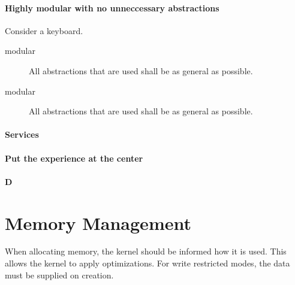 \documentclass[a4paper]{article}
\begin{document}
\begin{itemize}
\begin{itemize}
\paragraph{Highly modular with no unneccessary abstractions} Consider a keyboard. 

\begin{description}
  \item[modular] All abstractions that are used shall be as general as possible.
  \item[modular] All abstractions that are used shall be as general as possible.
\end{description}

\paragraph{Services}



\paragraph{Put the experience at the center} 
\paragraph{D} 




\section{Memory Management}

When allocating memory, the kernel should be informed how it is used. This allows the kernel to apply optimizations.
For write restricted modes, the data must be supplied on creation.


\end{itemize}
\end{itemize}
\end{document}
